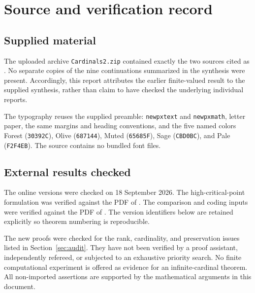 \documentclass[11pt,letterpaper]{article}
\theoremstyle{definition}
\numberwithin{equation}{section}
\begin{document}
\section{Source and verification record}\label{app:sources}

\subsection{Supplied material}

The uploaded archive \nolinkurl{Cardinals2.zip} contained exactly the two sources cited as \cite{Unified,Synthesis}. No separate copies of the nine continuations summarized in the synthesis were present. Accordingly, this report attributes the earlier finite-valued result to the supplied synthesis, rather than claim to have checked the underlying individual reports.

The typography reuses the supplied preamble: \nolinkurl{newpxtext} and \nolinkurl{newpxmath}, letter paper, the same margins and heading conventions, and the five named colors Forest (\texttt{30392C}), Olive (\texttt{687144}), Muted (\texttt{65685F}), Sage (\texttt{CBD0BC}), and Pale (\texttt{F2F4EB}). The source contains no bundled font files.

\subsection{External results checked}

The online versions were checked on 18 September 2026. The high-critical-point formulation was verified against the PDF of \cite[Lemma 3.2]{ABL}. The comparison and coding inputs were verified against the PDF of \cite[Theorem A and Proposition 3.9]{ABGL}. The version identifiers below are retained explicitly so theorem numbering is reproducible.

The new proofs were checked for the rank, cardinality, and preservation issues listed in Section~\ref{sec:audit}. They have not been verified by a proof assistant, independently refereed, or subjected to an exhaustive priority search. No finite computational experiment is offered as evidence for an infinite-cardinal theorem. All non-imported assertions are supported by the mathematical arguments in this document.
\end{document}
